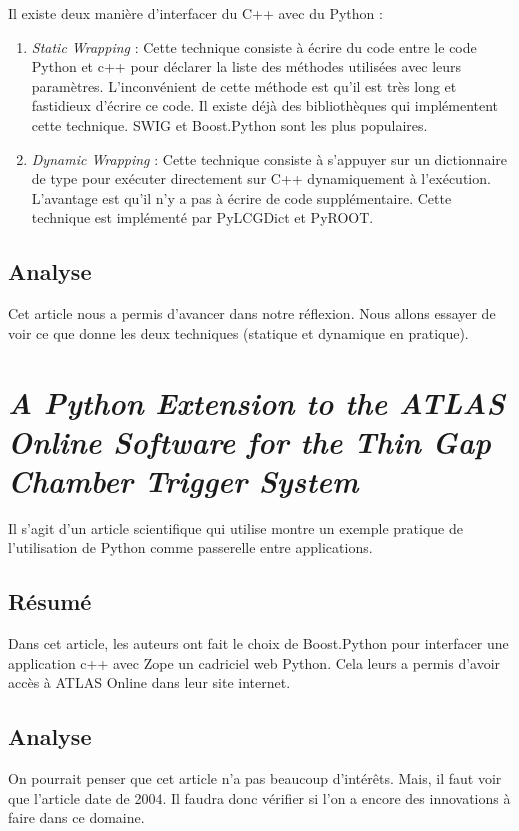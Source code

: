 \documentclass[11pt, french, screen]{report-rd-info}
\begin{document}
Il existe deux manière d'interfacer du C++ avec du Python :
\begin{enumerate}
\item \emph{Static Wrapping} : Cette technique consiste à écrire du code entre le code Python et c++ pour déclarer la liste des méthodes utilisées avec leurs paramètres. L'inconvénient de cette méthode est qu'il est très long et fastidieux d'écrire ce code. Il existe déjà des bibliothèques qui implémentent cette technique. SWIG et Boost.Python sont les plus populaires.
\item \emph{Dynamic Wrapping} : Cette technique consiste à s'appuyer sur un dictionnaire de type pour exécuter directement sur C++ dynamiquement à l'exécution. L'avantage est qu'il n'y a pas à écrire de code supplémentaire. Cette technique est implémenté par PyLCGDict et PyROOT.
\end{enumerate}

\subsection{Analyse}

Cet article nous a permis d'avancer dans notre réflexion. Nous allons essayer de voir ce que donne les deux techniques (statique et dynamique en pratique).

\section{\emph{A Python Extension to the ATLAS Online Software for the Thin Gap Chamber Trigger System}}

Il s'agit d'un article scientifique \cite{2004APETTAOSFTTGCTSTadashi} qui utilise montre un exemple pratique de l'utilisation de Python comme passerelle entre applications.

\subsection{Résumé}

Dans cet article, les auteurs ont fait le choix de Boost.Python pour interfacer une application c++ avec Zope un cadriciel web Python. Cela leurs a permis d'avoir accès à ATLAS Online dans leur site internet.

\subsection{Analyse}

On pourrait penser que cet article n'a pas beaucoup d'intérêts. Mais, il faut voir que l'article date de 2004. Il faudra donc vérifier si l'on a encore des innovations à faire dans ce domaine.
\end{document}
